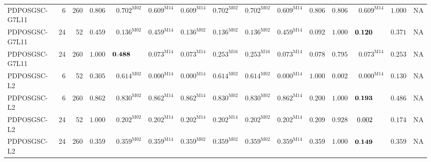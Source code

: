 \documentclass[10pt,a4paper]{article}
\begin{document}
\begin{longtable}{@{}lrrrrrrrrrrrrrr@{}}
PDPOSGSC-G7L11 & 6 & 260 & $\mathbf{0.806}$ & $\mathbf{0.702}^{\mathrm{M02}}$ & $\mathbf{0.609}^{\mathrm{M14}}$ & $\mathbf{0.609}^{\mathrm{M14}}$ & $\mathbf{0.702}^{\mathrm{M02}}$ & $\mathbf{0.702}^{\mathrm{M02}}$ & $\mathbf{0.609}^{\mathrm{M14}}$ & $\mathbf{0.806}$ & $\mathbf{0.806}$ & $\mathbf{0.609}^{\mathrm{M14}}$ & $\mathbf{1.000}$ & \textsc{NA} \\
PDPOSGSC-G7L11 & 24 & 52 & $\mathbf{0.459}$ & $\mathbf{0.136}^{\mathrm{M02}}$ & $\mathbf{0.459}^{\mathrm{M14}}$ & $\mathbf{0.136}^{\mathrm{M02}}$ & $\mathbf{0.136}^{\mathrm{M02}}$ & $\mathbf{0.136}^{\mathrm{M02}}$ & $\mathbf{0.459}^{\mathrm{M14}}$ & $0.092$ & $\mathbf{1.000}$ & $\mathbf{0.120}\hphantom{^{\mathrm{M00}}}$ & $\mathbf{0.371}$ & \textsc{NA} \\
PDPOSGSC-G7L11 & 24 & 260 & $\mathbf{1.000}$ & $\mathbf{0.488}\hphantom{^{\mathrm{M00}}}$ & $0.073^{\mathrm{M14}}$ & $0.073^{\mathrm{M14}}$ & $\mathbf{0.253}^{\mathrm{M16}}$ & $\mathbf{0.253}^{\mathrm{M16}}$ & $0.073^{\mathrm{M14}}$ & $0.078$ & $\mathbf{0.795}$ & $0.073^{\mathrm{M14}}$ & $\mathbf{0.253}$ & \textsc{NA} \\
PDPOSGSC-L2 & 6 & 52 & $\mathbf{0.305}$ & $\mathbf{0.614}^{\mathrm{M02}}$ & $0.000^{\mathrm{M14}}$ & $0.000^{\mathrm{M14}}$ & $\mathbf{0.614}^{\mathrm{M02}}$ & $\mathbf{0.614}^{\mathrm{M02}}$ & $0.000^{\mathrm{M14}}$ & $\mathbf{1.000}$ & $0.002$ & $0.000^{\mathrm{M14}}$ & $\mathbf{0.130}$ & \textsc{NA} \\
PDPOSGSC-L2 & 6 & 260 & $\mathbf{0.862}$ & $\mathbf{0.830}^{\mathrm{M02}}$ & $\mathbf{0.862}^{\mathrm{M14}}$ & $\mathbf{0.862}^{\mathrm{M14}}$ & $\mathbf{0.830}^{\mathrm{M02}}$ & $\mathbf{0.830}^{\mathrm{M02}}$ & $\mathbf{0.862}^{\mathrm{M14}}$ & $\mathbf{0.200}$ & $\mathbf{1.000}$ & $\mathbf{0.193}\hphantom{^{\mathrm{M00}}}$ & $\mathbf{0.486}$ & \textsc{NA} \\
PDPOSGSC-L2 & 24 & 52 & $\mathbf{1.000}$ & $\mathbf{0.202}^{\mathrm{M02}}$ & $\mathbf{0.202}^{\mathrm{M14}}$ & $\mathbf{0.202}^{\mathrm{M14}}$ & $\mathbf{0.202}^{\mathrm{M14}}$ & $\mathbf{0.202}^{\mathrm{M02}}$ & $\mathbf{0.202}^{\mathrm{M14}}$ & $\mathbf{0.209}$ & $\mathbf{0.928}$ & $0.002\hphantom{^{\mathrm{M00}}}$ & $\mathbf{0.174}$ & \textsc{NA} \\
PDPOSGSC-L2 & 24 & 260 & $\mathbf{0.359}$ & $\mathbf{0.359}^{\mathrm{M02}}$ & $\mathbf{0.359}^{\mathrm{M14}}$ & $\mathbf{0.359}^{\mathrm{M02}}$ & $\mathbf{0.359}^{\mathrm{M02}}$ & $\mathbf{0.359}^{\mathrm{M02}}$ & $\mathbf{0.359}^{\mathrm{M14}}$ & $\mathbf{0.359}$ & $\mathbf{1.000}$ & $\mathbf{0.149}\hphantom{^{\mathrm{M00}}}$ & $\mathbf{0.359}$ & \textsc{NA} \\

\end{longtable}
\end{document}
